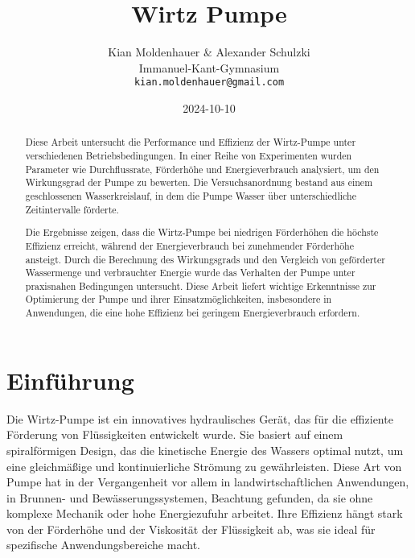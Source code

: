 \documentclass[12pt]{article}
\begin{document}
\title{Wirtz Pumpe}
\author{Kian Moldenhauer \& Alexander Schulzki\\Immanuel-Kant-Gymnasium\\\texttt{kian.moldenhauer@gmail.com}}
\date{2024-10-10} %
\maketitle

\begin{abstract}
Diese Arbeit untersucht die Performance und Effizienz der Wirtz-Pumpe unter verschiedenen Betriebsbedingungen. In einer Reihe von Experimenten wurden Parameter wie Durchflussrate, Förderhöhe und Energieverbrauch analysiert, um den Wirkungsgrad der Pumpe zu bewerten. Die Versuchsanordnung bestand aus einem geschlossenen Wasserkreislauf, in dem die Pumpe Wasser über unterschiedliche Zeitintervalle förderte.

Die Ergebnisse zeigen, dass die Wirtz-Pumpe bei niedrigen Förderhöhen die höchste Effizienz erreicht, während der Energieverbrauch bei zunehmender Förderhöhe ansteigt. Durch die Berechnung des Wirkungsgrads und den Vergleich von geförderter Wassermenge und verbrauchter Energie wurde das Verhalten der Pumpe unter praxisnahen Bedingungen untersucht. Diese Arbeit liefert wichtige Erkenntnisse zur Optimierung der Pumpe und ihrer Einsatzmöglichkeiten, insbesondere in Anwendungen, die eine hohe Effizienz bei geringem Energieverbrauch erfordern.
\end{abstract}

\tableofcontents  %
\newpage          %

\section{Einführung}
Die Wirtz-Pumpe ist ein innovatives hydraulisches Gerät, das für die effiziente Förderung von Flüssigkeiten entwickelt wurde. Sie basiert auf einem spiralförmigen Design, das die kinetische Energie des Wassers optimal nutzt, um eine gleichmäßige und kontinuierliche Strömung zu gewährleisten. Diese Art von Pumpe hat in der Vergangenheit vor allem in landwirtschaftlichen Anwendungen, in Brunnen- und Bewässerungssystemen, Beachtung gefunden, da sie ohne komplexe Mechanik oder hohe Energiezufuhr arbeitet. Ihre Effizienz hängt stark von der Förderhöhe und der Viskosität der Flüssigkeit ab, was sie ideal für spezifische Anwendungsbereiche macht.
\end{document}
